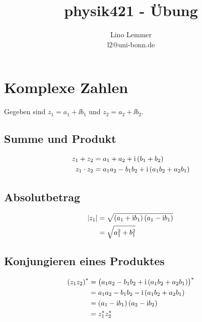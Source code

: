 

\setcounter{thezettel}{1}
\renewcommand\thesection{\arabic{thezettel}.\arabic{section}}

\title{physik421 - Übung }
\author{Lino Lemmer \\ \small{l2@uni-bonn.de}}


\maketitle

\section{Komplexe Zahlen}

Gegeben sind $z_1 = a_1 + \ii b_1$ und $z_2 = a_2 + \ii b_2$.

\subsection{Summe und Produkt}

\begin{align*}
    z_1 + z_2 &= a_1 + a_2 + \ii\del{b_1 + b_2} \\
    z_1 \cdot z_2 &= a_1a_2 - b_1b_2 + \ii\del{a_1b_2+a_2b_1}
\end{align*}

\subsection{Absolutbetrag}

\begin{align*}
    \abs{z_1} &= \sqrt{\del{a_1 + \ii b_1}\del{a_1 - \ii b_1}} \\
              &= \sqrt{a_1^2 + b_1^2}
\end{align*}

\subsection{Konjungieren eines Produktes}

\begin{align*}
    \del{z_1z_2}^* &= \del{a_1a_2 - b_1b_2 + \ii\del{a_1b_2 + a_2b_1}}^* \\
                   &= a_1a_2 - b_1b_2 - \ii\del{a_1b_2 + a_2b_1} \\
                   &= \del{a_1 - \ii b_1}\del{a_2 - \ii b_2} \\
                   &= z_1^* z_2^*
\end{align*}


